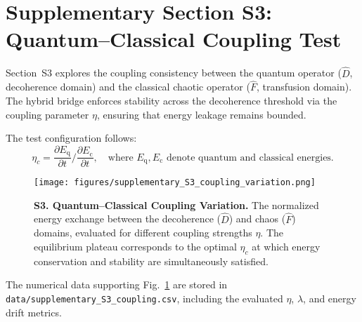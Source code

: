 
\clearpage
\section*{Supplementary Section S3: Quantum–Classical Coupling Test}

\noindent
Section~S3 explores the coupling consistency between the quantum operator
($\hat{D}$, decoherence domain) and the classical chaotic operator
($\hat{F}$, transfusion domain). The hybrid bridge enforces stability across
the decoherence threshold via the coupling parameter $\eta$, ensuring
that energy leakage remains bounded.

The test configuration follows:
\[
\eta_c = \frac{\partial E_{\mathrm{q}}}{\partial t}
         \bigg/ \frac{\partial E_{\mathrm{c}}}{\partial t},
\quad
\text{where } E_{\mathrm{q}}, E_{\mathrm{c}} \text{ denote quantum and classical energies.}
\]

\begin{figure}[h!]
    \centering
    \texttt{[image: figures/supplementary\_S3\_coupling\_variation.png]}
    \caption{
        \textbf{S3. Quantum–Classical Coupling Variation.}
        The normalized energy exchange between the decoherence ($\hat{D}$)
        and chaos ($\hat{F}$) domains, evaluated for different coupling
        strengths $\eta$. The equilibrium plateau corresponds to the
        optimal $\eta_c$ at which energy conservation and stability are
        simultaneously satisfied.
    }
    \label{fig:s3_coupling}
\end{figure}

\vspace{1em}
The numerical data supporting Fig.~\ref{fig:s3_coupling} are stored in
\texttt{data/supplementary\_S3\_coupling.csv}, including the evaluated
$\eta$, $\lambda$, and energy drift metrics.
